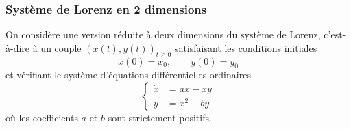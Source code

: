 \subsubsection{Système de Lorenz en 2 dimensions} 

On considère une version réduite à deux dimensions du système de Lorenz, c'est-à-dire à un couple $(x(t), y(t))_{t \geq 0}$ satisfaisant les conditions initiales
$$
x(0) = x_0, \qquad y(0) = y_0
$$
et vérifiant le système d'équations différentielles ordinaires
\begin{equation*} %
  \left\{\begin{array}{rcl}
    \dot x & = a x - xy \\
    \dot y & = x^2 - by
  \end{array}\right.
\end{equation*}
où les coefficients $a$ et $b$ sont strictement positifs.

